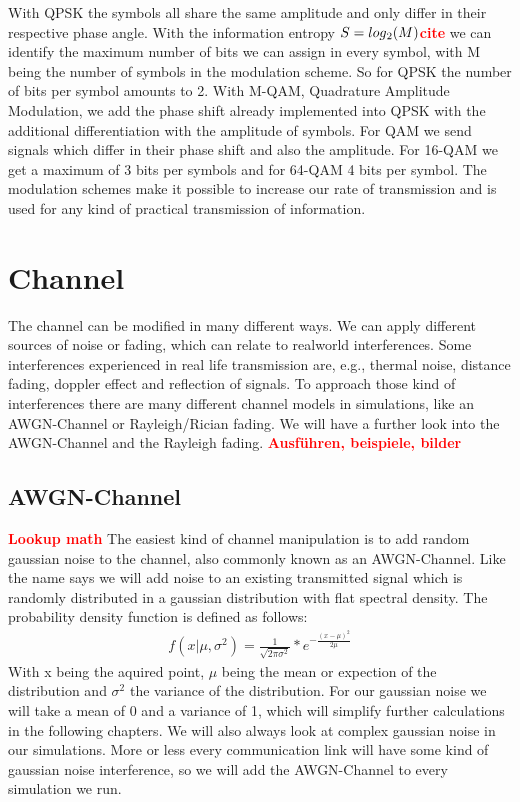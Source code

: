 \documentclass[12pt,oneside, reqno]{report}
\newcommand\boldred[1]{\textcolor{red}{\textbf{#1}}}
\begin{document}
With QPSK the symbols all share the same amplitude and only differ in their respective phase angle. With the information entropy $S = log\textsubscript{2}(M)$\boldred{cite} we can identify the maximum number of bits we can assign in every symbol, with M being the number of symbols in the modulation scheme. So for QPSK the number of bits per symbol amounts to 2.
\newline
With M-QAM, Quadrature Amplitude Modulation, we add the phase shift already implemented into QPSK with the additional differentiation with the amplitude of symbols. For QAM we send signals which differ in their phase shift and also the amplitude.  For 16-QAM we get a maximum of 3 bits per symbols and for 64-QAM 4 bits per symbol.
The modulation schemes make it possible to increase our rate of transmission and is used for any kind of practical transmission of information.

\section{Channel}
\label{sec:channel}
The channel can be modified in many different ways. We can apply different sources of noise or fading, which can relate to realworld interferences. Some interferences experienced in real life transmission are, e.g., thermal noise, distance fading, doppler effect and reflection of signals. To approach those kind of interferences there are many different channel models in simulations, like an \gls{AWGN}-Channel or Rayleigh/Rician fading. We will have a further look into the \gls{AWGN}-Channel and the Rayleigh fading.
\newline
\boldred{Ausführen, beispiele, bilder}
\subsection{AWGN-Channel}
\boldred{Lookup math}
\newline
The easiest kind of channel manipulation is to add random gaussian noise to the channel, also commonly known as an \gls{AWGN}-Channel. Like the name says we will add noise to an existing transmitted signal which is randomly distributed in a gaussian distribution with flat spectral density. The probability density function is defined as follows:
\begin{gather*}
f(x|\mu,\sigma^2) = \frac{1}{\sqrt{2\pi\sigma^2}}*e^{-\frac{(x-\mu)^2}{2\mu}}
\end{gather*}
With x being the aquired point, $\mu$ being the mean or expection of the distribution and $\sigma^2$ the variance of the distribution. For our gaussian noise we will take a mean of 0 and a variance of 1, which will simplify further calculations in the following chapters. We will also always look at complex gaussian noise in our simulations. More or less every communication link will have some kind of gaussian noise interference, so we will add the AWGN-Channel to every simulation we run.
\end{document}
